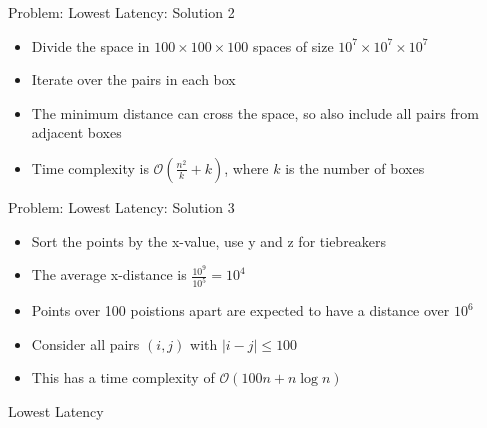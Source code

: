 \documentclass[11pt,pdf, aspectratio=169]{beamer}
\begin{document}
  \begin{frame}{Problem: Lowest Latency: Solution 2}
    \begin{itemize}
      \item Divide the space in $100\times 100 \times 100$ spaces of size $10^7 \times 10^7 \times 10^7$
      \item Iterate over the pairs in each box
      \item The minimum distance can cross the space, so also include all pairs from adjacent boxes
      \item Time complexity is $\mathcal{O}\left(\frac{n^2}{k} + k\right)$, where $k$ is the number of boxes
    \end{itemize}
  \end{frame}
  \begin{frame}{Problem: Lowest Latency: Solution 3}
    \begin{itemize}
      \item Sort the points by the x-value, use y and z for tiebreakers
      \item The average x-distance is $\frac{10^9}{10^5} = 10^4$
      \item Points over 100 poistions apart are expected to have a distance over $10^6$
      \item Consider all pairs $(i, j)$ with $|i-j| \leq 100$
      \item This has a time complexity of $\mathcal{O}(100n + n \log n)$
    \end{itemize}
  \end{frame}
  \begin{frame}[containsverbatim]{Lowest Latency}
    \inputminted{python}{code/session-4/bapc-l.py}
  \end{frame}
\end{document}
